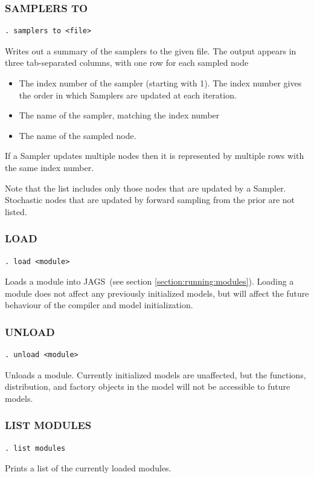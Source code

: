 \documentclass[11pt, a4paper, titlepage]{report}
\newcommand{\JAGS}{\textsf{JAGS}}
\begin{document}
\subsubsection{SAMPLERS TO}
\label{samplers:to}
\begin{verbatim}
. samplers to <file>
\end{verbatim}
Writes out a summary of the samplers to the given file.  The output appears
in three tab-separated columns, with one row for each sampled node
\begin{itemize}
\item The index number of the sampler (starting with 1). The index number 
gives the order in which Samplers are updated at each iteration.
\item The name of the sampler, matching the index number
\item The name of the sampled node. 
\end{itemize}
If a Sampler updates multiple nodes then it is represented by multiple rows
with the same index number.

Note that the list includes only those nodes that are updated by a
Sampler.  Stochastic nodes that are updated by forward sampling from
the prior are not listed.

\subsubsection{LOAD}
\label{load}
\begin{verbatim}
. load <module>
\end{verbatim}
Loads a module into \JAGS\ (see section \ref{section:running:modules}). Loading
a module does not affect any previously initialized models, but will
affect the future behaviour of the compiler and model initialization.

\subsubsection{UNLOAD}
\label{unload}
\begin{verbatim}
. unload <module>
\end{verbatim}
Unloads a module. Currently initialized models are unaffected, but
the functions, distribution, and factory objects in the model will not
be accessible to future models.

\subsubsection{LIST MODULES}
\label{list:modules}
\begin{verbatim}
. list modules
\end{verbatim}
Prints a list of the currently loaded modules.
\end{document}
